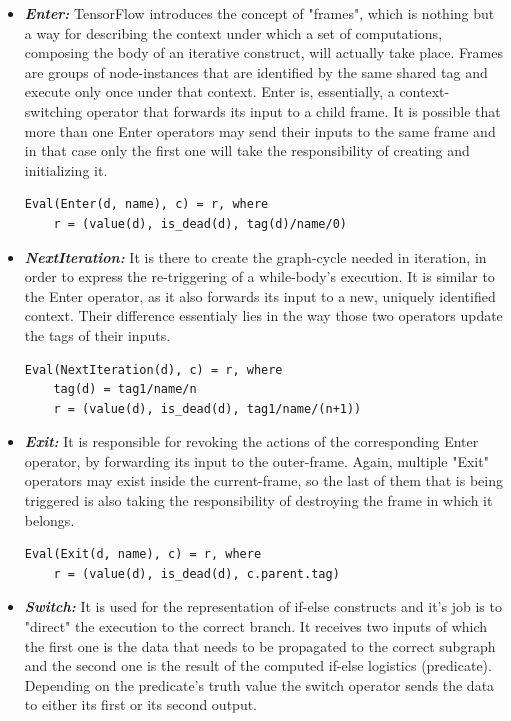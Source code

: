 \documentclass[ack,preface]{dithesis}
\begin{document}
    \begin{itemize}

    \item \textit{\textbf{Enter:}} TensorFlow introduces the concept of "frames", which is nothing but a way for describing the context under which a set of computations, composing the body of an iterative construct, will actually take place. Frames are groups of node-instances that are identified by the same shared tag and execute only once under that context. Enter is, essentially, a context-switching operator that forwards its input to a child frame. It is possible that more than one Enter operators may send their inputs to the same frame and in that case only the first one will take the responsibility of creating and initializing it.
\begin{lstlisting}
Eval(Enter(d, name), c) = r, where
	r = (value(d), is_dead(d), tag(d)/name/0)
\end{lstlisting}

    \item \textit{\textbf{NextIteration:}} It is there to create the graph-cycle needed in iteration, in order to express the re-triggering of a while-body's execution. It is similar to the Enter operator, as it also forwards its input to a new, uniquely identified context. Their difference essentialy lies in the way those two operators update the tags of their inputs.
\begin{lstlisting}
Eval(NextIteration(d), c) = r, where
	tag(d) = tag1/name/n
	r = (value(d), is_dead(d), tag1/name/(n+1))
\end{lstlisting}

    \item \textit{\textbf{Exit:}} It  is responsible for revoking the actions of the corresponding Enter operator, by forwarding its input to the outer-frame.
 Again, multiple "Exit" operators may exist inside the current-frame, so the last of them that is being triggered is also taking the responsibility of destroying the frame in which it belongs.
\begin{lstlisting}
Eval(Exit(d, name), c) = r, where
	r = (value(d), is_dead(d), c.parent.tag)
\end{lstlisting}

    \item \textit{\textbf{Switch:}} It is used for the representation of if-else constructs and it's job is to "direct" the execution to the correct branch. It receives two inputs of which the first one is the data that needs to be propagated to the correct subgraph and the second one is the result of the computed if-else logistics  (predicate). Depending on the predicate's truth value the switch operator sends the data to either its first or its second output. 


\end{itemize}
\end{document}
